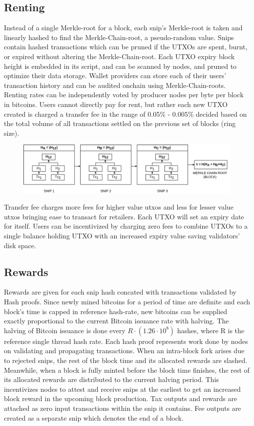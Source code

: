 \documentclass[a4paper, 10pt]{extarticle}
\begin{document}
\subsection{Renting}
Instead of a single Merkle-root for a block, each snip's Merkle-root is taken and linearly hashed to find the Merkle-Chain-root, a pseudo-random value. Snips contain hashed transactions which can be pruned if the UTXOs are spent, burnt, or expired without altering the Merkle-Chain-root. Each UTXO expiry block height is embedded in its script, and can be scanned by nodes, and pruned to optimize their data storage. Wallet providers can store each of their users' transaction history and can be audited onchain using Merkle-Chain-roots. Renting rates can be independently voted by producer nodes per byte per block in bitcoins. Users cannot directly pay for rent, but rather each new UTXO created is charged a transfer fee in the range of 0.05\% - 0.005\% decided based on the total volume of all transactions settled on the previous set of blocks (ring size).
\begin{figure}[H]
\begin{center}
\includegraphics[width=13cm]{merklechain}
\end{center}
\end{figure}
 Transfer fee charges more fees for higher value utxos and less for lesser value utxos bringing ease to transact for retailers. Each UTXO will set an expiry date for itself. Users can be incentivized by charging zero fees to combine UTXOs to a single balance holding UTXO with an increased expiry value saving validators' disk space. 
\subsection{Rewards}
Rewards are given for each snip hash concated with transactions validated by Hash proofs. Since newly mined bitcoins for a period of time are definite and each block's time is capped in reference hash-rate, new bitcoins can be supplied exactly proportional to the current Bitcoin issuance rate with halving. The halving of Bitcoin issuance is done every $R \cdot (1.26 \cdot 10^8)$ hashes, where R is the reference single thread hash rate. Each hash proof represents work done by nodes on validating and propagating transactions. When an intra-block fork arises due to rejected snips, the rest of the block time and its allocated rewards are slashed. Meanwhile, when a block is fully minted before the block time finishes, the rest of its allocated rewards are distributed to the current halving period. This incentivizes nodes to attest and receive snips at the earliest to get an increased block reward in the upcoming block production. Tax outputs and rewards are attached as zero input transactions within the snip it contains. Fee outputs are created as a separate snip which denotes the end of a block.
\end{document}
